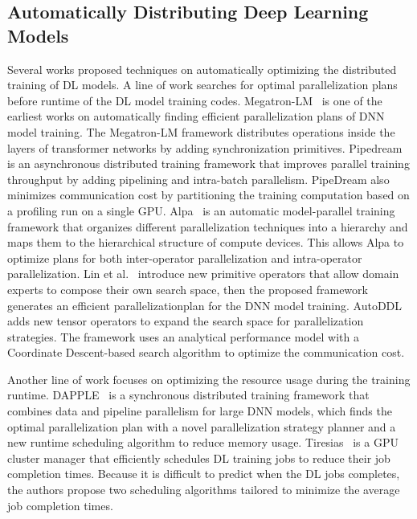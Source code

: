 \begin{inred}

\subsection{Automatically Distributing Deep Learning Models}

Several works proposed techniques on automatically optimizing the
distributed training of DL models.
A line of work searches for optimal parallelization plans
before runtime of the DL model training codes.
Megatron-LM~\cite{megatron-lm} is one of the earliest works on automatically 
finding efficient parallelization plans of DNN model training. 
The Megatron-LM framework distributes operations inside the layers of 
transformer networks by adding synchronization primitives.
Pipedream~\cite{pipedream} is an asynchronous distributed training framework 
that improves parallel training throughput by adding pipelining and intra-batch parallelism. 
PipeDream also minimizes communication cost by partitioning the training computation based on a profiling run on a single GPU.
Alpa~\cite{alpa} is an automatic model-parallel training framework that 
organizes different parallelization techniques into a hierarchy 
and maps them to the hierarchical structure of compute devices. 
This allows Alpa to optimize plans for both inter-operator parallelization and intra-operator parallelization.
Lin et al.~\cite{nnscaler} introduce new primitive operators 
that allow domain experts to compose their own search space, 
then the proposed framework generates an efficient parallelizationplan for the DNN model training.
AutoDDL~\cite{autoddl} adds new tensor operators to expand the search space for parallelization strategies. 
The framework uses an analytical performance model with a Coordinate Descent-based search algorithm to optimize the communication cost.

Another line of work focuses on optimizing the resource usage
during the training runtime. 
DAPPLE~\cite{dapple} is a synchronous distributed training framework 
that combines data and pipeline parallelism for large DNN models, 
which finds the optimal parallelization plan with a novel parallelization strategy planner 
and a new runtime scheduling algorithm to reduce memory usage.
Tiresias~\cite{tiresias} is a GPU cluster manager 
that efficiently schedules DL training jobs to reduce their job completion times. 
Because it is difficult to predict when the DL jobs completes, 
the authors propose two scheduling algorithms tailored to minimize the average job completion times.


\end{inred}
